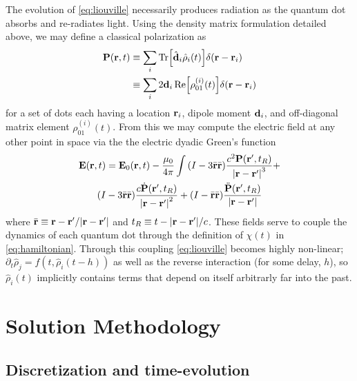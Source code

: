 \documentclass[conference]{IEEEtran}
\begin{document}
The evolution of \cref{eq:liouville} necessarily produces radiation as the quantum dot absorbs and re-radiates light.
Using the density matrix formulation detailed above, we may define a classical polarization as
\begin{equation}
  \begin{aligned}
    \vb{P}(\vb{r}, t) &\equiv \sum_i \Tr[\hat{\vb{d}}_i \hat{\rho}_i(t)] \delta(\vb{r} - \vb{r}_i) \\
                      &\equiv \sum_i 2 \vb{d}_i \Re\!\qty[\rho_{01}^{(i)}(t)] \delta(\vb{r} - \vb{r}_i)
  \end{aligned}
  \label{eq:polarization}
\end{equation}
for a set of dots each having a location $\vb{r}_i$, dipole moment $\vb{d}_i$, and off-diagonal matrix element $\rho_{01}^{(i)}(t)$.
From this we may compute the electric field at any other point in space via the the electric dyadic Green's function\cite{Rothwell2008}
\begin{equation}
  \begin{gathered}
    \vb{E}(\vb{r}, t) = \vb{E}_0(\vb{r}, t) - \frac{\mu_0}{4\pi} \int
      \qty(I - 3\bar{\vb{r}}\bar{\vb{r}}) \frac{c^2 \vb{P}(\vb{r}', t_R)}{\abs{\vb{r} - \vb{r}'}^3} + \\
      \qty(I - 3\bar{\vb{r}}\bar{\vb{r}}) \frac{c \dot{\vb{P}}(\vb{r}', t_R)}{\abs{\vb{r} - \vb{r}'}^2} +
      \qty(I -  \bar{\vb{r}}\bar{\vb{r}}) \frac{\ddot{\vb{P}}(\vb{r}', t_R)}{\abs{\vb{r} - \vb{r}'}}
  \end{gathered}
  \label{eq:efield}
\end{equation}
where $\bar{\vb{r}} \equiv \vb{r} - \vb{r}'/\abs{\vb{r} - \vb{r}'}$ and $t_R \equiv t - \abs{\vb{r} - \vb{r}'}/c$.
These fields serve to couple the dynamics of each quantum dot through the definition of $\chi(t)$ in \cref{eq:hamiltonian}.
Through this coupling \cref{eq:liouville} becomes highly non-linear; $\partial_t \hat{\rho}_j = f(t, \hat{\rho}_i(t - h))$ as well as the reverse interaction (for some delay, $h$), so $\hat{\rho}_i(t)$ implicitly contains terms that depend on itself arbitrarly far into the past.



\section{Solution Methodology}
\subsection{Discretization and time-evolution}
\end{document}
